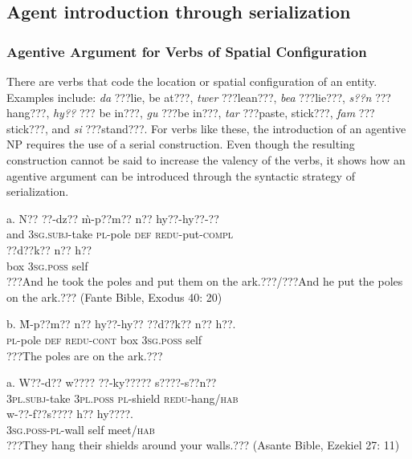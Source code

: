 \documentclass[output=paper]{langsci/langscibook}
\begin{document}
\subsection{Agent introduction through serialization}
\subsubsection{Agentive Argument for Verbs of Spatial Configuration}

There are verbs that code the location or spatial configuration of an entity. Examples  include: \emph{da} ???lie, be at???, \emph{twer} ???lean???, \emph{bea} ???lie???, \emph{s??n} ???hang???, \emph{hy??} ??? be in???, \emph{gu} ???be in???, \emph{tar} ???paste, stick???, \emph{fam} ???stick???, and \emph{si} ???stand???. For verbs like these, the introduction of an agentive NP requires the use of a serial construction. Even though the resulting construction cannot be said to increase the valency of the verbs, it shows how an agentive argument can be introduced through the syntactic strategy of serialization.


\ea
\gll a.  N??  ??{}-dz??     \`{m}-p??m??   n??  hy??-hy??-?? \\
             and  \textsc{3sg.subj}{}-take  \textsc{pl}{}-pole    \textsc{def}  \textsc{redu}{}-put-\textsc{compl}  \\
\gll   ??d??k??     n??    h??  \\
       box    \textsc{3sg.poss}  self  \\
\glt    ???And he took the poles and put them on the ark.???/???And he put the poles on the ark.??? (Fante Bible, Exodus 40: 20)
\z

\ea
\gll  b.  \`{M}-p??m??   n??   hy??-hy??   ??d??k??  n??    h??.\\
       \textsc{pl}{}-pole    \textsc{def}  \textsc{redu-cont}  box  \textsc{3sg.poss}  self  \\
\glt   ???The poles are on the ark.???
\z

\ea
\gll a.   W??-d??    w????    ??-ky?????   s????-s??n?? \\
       \textsc{3pl.subj}{}-take  \textsc{3pl.poss}  \textsc{pl}{}-shield  \textsc{redu}{}-hang/\textsc{hab}\\
\gll   w-??-f??s????    h??   hy????.    \\
       \textsc{3sg.poss-pl}{}-wall  self  meet/\textsc{hab}  \\
\glt ???They hang their shields around your walls.??? (Asante Bible, Ezekiel 27: 11)
\z
\end{document}
